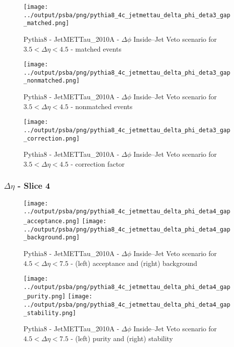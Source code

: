 \documentclass[11pt]{book}
\begin{document}
\begin{figure}[ht]
\centering
\texttt{[image: ../output/psba/png/pythia8\_4c\_jetmettau\_delta\_phi\_deta3\_gap\_matched.png]}
\caption{Pythia8 - JetMETTau\_2010A - $\Delta\phi$ Inside--Jet Veto scenario for $3.5 < \Delta\eta < 4.5$ - matched events}
\label{fig:p8_jetmettau_delta_phi_deta3_gap_matched}
\end{figure}

\begin{figure}[ht]
\centering
\texttt{[image: ../output/psba/png/pythia8\_4c\_jetmettau\_delta\_phi\_deta3\_gap\_nonmatched.png]}
\caption{Pythia8 - JetMETTau\_2010A - $\Delta\phi$ Inside--Jet Veto scenario for $3.5 < \Delta\eta < 4.5$ - nonmatched events}
\label{fig:p8_jetmettau_delta_phi_deta3_gap_nonmatched}
\end{figure}

\begin{figure}[ht]
\centering
\texttt{[image: ../output/psba/png/pythia8\_4c\_jetmettau\_delta\_phi\_deta3\_gap\_correction.png]}
\caption{Pythia8 - JetMETTau\_2010A - $\Delta\phi$ Inside--Jet Veto scenario for $3.5 < \Delta\eta < 4.5$ - correction factor}
\label{fig:p8_jetmettau_delta_phi_deta3_gap_correction}
\end{figure}


\clearpage
\subsubsection{$\Delta\eta$ - Slice 4}
\begin{figure}[ht]
\centering
\texttt{[image: ../output/psba/png/pythia8\_4c\_jetmettau\_delta\_phi\_deta4\_gap\_acceptance.png]}
\texttt{[image: ../output/psba/png/pythia8\_4c\_jetmettau\_delta\_phi\_deta4\_gap\_background.png]}
\caption{Pythia8 - JetMETTau\_2010A - $\Delta\phi$ Inside--Jet Veto scenario for $4.5 < \Delta\eta < 7.5$ - (left) acceptance and (right) background}
\label{fig:p8_jetmettau_delta_phi_deta4_gap_ab}
\end{figure}

\begin{figure}[ht]
\centering
\texttt{[image: ../output/psba/png/pythia8\_4c\_jetmettau\_delta\_phi\_deta4\_gap\_purity.png]}
\texttt{[image: ../output/psba/png/pythia8\_4c\_jetmettau\_delta\_phi\_deta4\_gap\_stability.png]}
\caption{Pythia8 - JetMETTau\_2010A - $\Delta\phi$ Inside--Jet Veto scenario for $4.5 < \Delta\eta < 7.5$ - (left) purity and (right) stability}
\label{fig:p8_jetmettau_delta_phi_deta4_gap_ps}
\end{figure}
\end{document}
